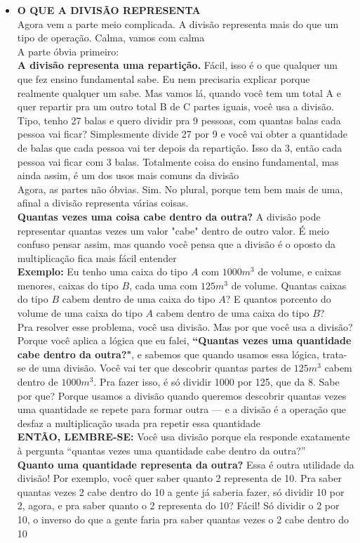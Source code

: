 \documentclass{article}
\begin{document}
\begin{itemize}
    \item \textbf{O QUE A DIVISÃO REPRESENTA}\\[5pt] Agora vem a parte meio complicada. A divisão representa mais do que um tipo de operação. Calma, vamos com calma
    \\[5pt]
    A parte óbvia primeiro:
    \\[5pt]
    \textbf{A divisão representa uma repartição.} Fácil, isso é o que qualquer um que fez ensino fundamental sabe. Eu nem precisaria explicar porque realmente qualquer um sabe. Mas vamos lá, quando você tem um total A e quer repartir pra um outro total B de C partes iguais, você usa a divisão. Tipo, tenho 27 balas e quero dividir pra 9 pessoas, com quantas balas cada pessoa vai ficar? Simplesmente divide 27 por 9 e você vai obter a quantidade de balas que cada pessoa vai ter depois da repartição. Isso da 3, então cada pessoa vai ficar com 3 balas. Totalmente coisa do ensino fundamental, mas ainda assim, é um dos usos mais comuns da divisão 
    \\[5pt]
    Agora, as partes não óbvias. Sim. No plural, porque tem bem mais de uma, afinal a divisão representa várias coisas.
    \\[5pt]
    \textbf{Quantas vezes uma coisa cabe dentro da outra?} A divisão pode representar quantas vezes um valor "cabe" dentro de outro valor. É meio confuso pensar assim, mas quando você pensa que a divisão é o oposto da multiplicação fica mais fácil entender
    \\[5pt]
    \textbf{Exemplo:} Eu tenho uma caixa do tipo $A$ com $1000m^3$ de volume, e caixas menores, caixas do tipo $B$, cada uma com $125m^3$ de volume. Quantas caixas do tipo $B$ cabem dentro de uma caixa do tipo $A$? E quantos porcento do volume de uma caixa do tipo $A$ cabem dentro de uma caixa do tipo $B$?
    \\[5pt]
    Pra resolver esse problema, você usa divisão. Mas por que você usa a divisão? Porque você aplica a lógica que eu falei, \textbf{``Quantas vezes uma quantidade cabe dentro da outra?"}, e sabemos que quando usamos essa lógica, trata-se de uma divisão. Você vai ter que descobrir quantas partes de $125m^3$ cabem dentro de $1000m^3$. Pra fazer isso, é só dividir 1000 por 125, que da 8. Sabe por que? Porque usamos a divisão quando queremos descobrir quantas vezes uma quantidade se repete para formar outra — e a divisão é a operação que desfaz a multiplicação usada pra repetir essa quantidade
    \\[5pt]
    \textbf{ENTÃO, LEMBRE-SE:} Você usa divisão porque ela responde exatamente à pergunta “quantas vezes uma quantidade cabe dentro da outra?”
    \\[5pt]
    \textbf{Quanto uma quantidade representa da outra?} Essa é outra utilidade da divisão! Por exemplo, você quer saber quanto 2 representa de 10. Pra saber quantas vezes 2 cabe dentro do 10 a gente já saberia fazer, só dividir 10 por 2, agora, e pra saber quanto o 2 representa do 10? Fácil! Só dividir o 2 por 10, o inverso do que a gente faria pra saber quantas vezes o 2 cabe dentro do 10

\end{itemize}
\end{document}
